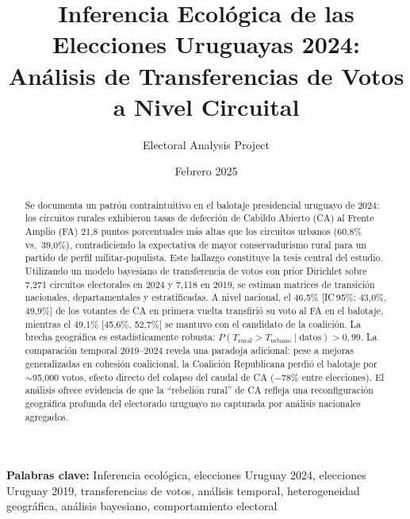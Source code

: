 \documentclass[12pt,a4paper]{article}
\title{%
    \textbf{Inferencia Ecológica de las Elecciones Uruguayas 2024:}\\
    \Large Análisis de Transferencias de Votos a Nivel Circuital
}
\author{Electoral Analysis Project}
\date{Febrero 2025}
\begin{document}
\maketitle

\begin{abstract}
\noindent
Se documenta un patrón contraintuitivo en el balotaje presidencial uruguayo de 2024: los circuitos rurales exhibieron tasas de defección de Cabildo Abierto (CA) al Frente Amplio (FA) 21{,}8 puntos porcentuales más altas que los circuitos urbanos (60{,}8\% vs.\ 39{,}0\%), contradiciendo la expectativa de mayor conservadurismo rural para un partido de perfil militar-populista. Este hallazgo constituye la tesis central del estudio. Utilizando un modelo bayesiano de transferencia de votos con prior Dirichlet sobre 7{,}271 circuitos electorales en 2024 y 7{,}118 en 2019, se estiman matrices de transición nacionales, departamentales y estratificadas. A nivel nacional, el 46{,}5\% [IC\,95\%: 43{,}0\%, 49{,}9\%] de los votantes de CA en primera vuelta transfirió su voto al FA en el balotaje, mientras el 49{,}1\% [45{,}6\%, 52{,}7\%] se mantuvo con el candidato de la coalición. La brecha geográfica es estadísticamente robusta: $P(T_{\text{rural}} > T_{\text{urbano}} \mid \text{datos}) > 0{,}99$. La comparación temporal 2019--2024 revela una paradoja adicional: pese a mejoras generalizadas en cohesión coalicional, la Coalición Republicana perdió el balotaje por $\sim$95{,}000 votos, efecto directo del colapso del caudal de CA ($-$78\% entre elecciones). El análisis ofrece evidencia de que la ``rebelión rural'' de CA refleja una reconfiguración geográfica profunda del electorado uruguayo no capturada por análisis nacionales agregados.
\end{abstract}

\vspace{0.5cm}
\noindent
\textbf{Palabras clave:} Inferencia ecológica, elecciones Uruguay 2024, elecciones Uruguay 2019, transferencias de votos, análisis temporal, heterogeneidad geográfica, análisis bayesiano, comportamiento electoral

\newpage

\tableofcontents
\newpage

\end{document}
